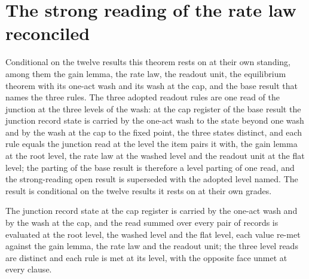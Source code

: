 \section{The strong reading of the rate law reconciled}\label{mod:I-3-D538602-rres-t1}
\begin{chconditional}\label{box:I-3-D538602-rres-t1:1}
Conditional on the twelve results this theorem rests on at their own standing, among them the gain lemma, the rate law, the readout unit, the equilibrium theorem with its one-act wash and its wash at the cap, and the base result that names the three rules.
The three adopted readout rules are one read of the junction at the three levels of the wash: at the cap register of the base result the junction record state is carried by the one-act wash to the state beyond one wash and by the wash at the cap to the fixed point, the three states distinct, and each rule equals the junction read at the level the item pairs it with, the gain lemma at the root level, the rate law at the washed level and the readout unit at the flat level; the parting of the base result is therefore a level parting of one read, and the strong-reading open result is superseded with the adopted level named. The result is conditional on the twelve results it rests on at their own grades.
\end{chconditional}
The junction record state at the cap register is carried by the one-act wash and by the wash at the cap, and the read summed over every pair of records is evaluated at the root level, the washed level and the flat level, each value re-met against the gain lemma, the rate law and the readout unit; the three level reads are distinct and each rule is met at its level, with the opposite face unmet at every clause.

